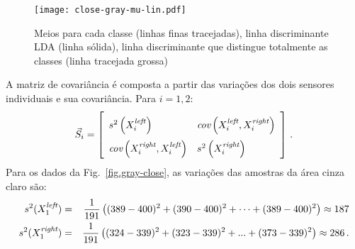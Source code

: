 \begin{figure}
\begin{center}
\texttt{[image: close-gray-mu-lin.pdf]}
\end{center}
\caption{Meios para cada classe (linhas finas tracejadas), linha discriminante LDA (linha sólida), linha discriminante que distingue totalmente as classes (linha tracejada grossa)}\label{fig.gray-close-mu-lin}
\end{figure}

A matriz de covariância é composta a partir das variações dos dois sensores individuais e sua covariância. Para $i=1,2$:
\[
\vec{S}_i = \left[
\renewcommand{\arraystretch}{2}
\begin{array}{l@{\hspace{1em}}l}
s^2\left(X_i^{\sub{left}}\right) &
\textit{cov}\left(X_i^{\sub{left}}, X_i^{\sub{right}}\right)\\
\textit{cov}\left(X_i^{\sub{right}},X_i^{\sub{left}}\right)&
s^2\left(X_i^{\sub{right}}\right)
\end{array}
\right]\,.
\]
Para os dados da Fig.~\ref{fig.gray-close}, as variações das amostras da área cinza claro são:
\begin{eqnarray*}
s^2(X_1^{\textit{\scriptsize left}}) &=& \frac{1}{191} \left((389 - 400)^2 + (390 - 400)^2 + \cdots + (389 - 400)^2 \right) \approx 187 \\
s^2(X_1^{\textit{\scriptsize right}}) &=& \frac{1}{191} \left((324 - 339)^2 + (323 - 339)^2 + ... + (373 - 339)^2 \right) \approx 286\,.
\end{eqnarray*}

